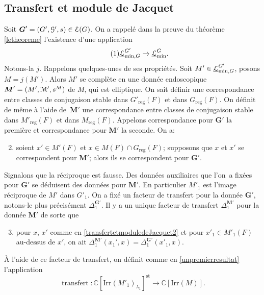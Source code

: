 \documentclass[11pt]{article}
\numberwithin{equation}{section}\providecommand{\og}{«\,}\providecommand{\fg}{\,»}
\let\mathcal \EuScript
\newcommand{\NoChangel}[1]{%
\expandafter\let\csname old\string#1\endcsname=#1
\let#1=\relax
\newcommand{#1}{\mathcode`l="716C\csname old\string#1\endcsname\mathcode`l="7160 }%
}
\newcommand{\Irr}{\mathrm{Irr}}
\newcommand{\trel}{\textup{-rel}} \NoChangel{\trel}
\newcommand{\reg}{\mathrm{reg}}
\newcommand{\st}{\mathrm{st}}
\DeclareMathOperator{\transfert}{transfert}
\newcommand{\bG}{\boldsymbol{G}}
\newcommand{\bM}{\boldsymbol{M}}
\newcommand{\cE}{\mathcal{E}}
\newcommand{\cG}{\mathcal{G}}
\newcommand{\cL}{\mathcal{L}}
\newcommand{\cM}{\mathcal{M}}
\newcommand{\CC}{\mathbb{C}}
\theoremstyle{plain}
\theoremstyle{definition}
\begin{document}
\subsection{Transfert et module de Jacquet}\label{transfertetmoduledeJacquet}
Soit $\bG'=(G',\cG',s)\in \cE(G)$. On a rappelé dans la preuve du théorème \ref{letheoreme} l'existence d'une application
\begin{equation}\tag{1}\label{transfertetmoduledeJacquet1}
\underline{\cL}_{\min,G\trel}^{G'}\to\underline{\cL}_{\min}^G.
\end{equation}
Notons-la $j$. Rappelons quelques-unes de ses propriétés. Soit $M'\in
\underline{\cL}_{\min,G\trel}^{G'}$, posons
$M=j(M')$. Alors $M'$ se complète en une donnée endoscopique $\bM'=(M',\cM',s^M)$ de $M$, qui est elliptique.
On sait définir une correspondance entre classes de conjugaison stable dans $G'_{\reg}(F)$ et dans $G_{\reg}(F)$. On définit de même à l'aide de~$\bM'$ une correspondance entre classes de conjugaison stable dans $M'_{\reg}(F)$ et dans $M_{\reg}(F)$. Appelons correspondance pour $\bG'$ la première et correspondance pour $\bM'$ la seconde. On a:
\begin{enumerate}\setcounter{enumi}{1}
\item\label{transfertetmoduledeJacquet2}
soient $x'\in M'(F)$ et $x\in M(F)\cap G_{\reg}(F)$; supposons que $x$ et $x'$ se correspondent pour $\bM'$; alors ils se correspondent pour $\bG'$.
\end{enumerate}

Signalons que la réciproque est fausse.
Des données auxiliaires que l'on~a fixées pour $\bG'$ se déduisent des données pour $\bM'$. En particulier $M'_{1}$ est l'image réciproque de $M'$ dans $G'_{1}$. On a fixé un facteur de transfert pour la donnée $\bG'$, notons-le plus précisément $\Delta_{1}^{\bG'}$. Il y a un unique facteur de transfert $\Delta_{1}^{\bM'}$ pour la donnée $\bM'$ de sorte que
\begin{enumerate}\setcounter{enumi}{2}
\item\label{transfertetmoduledeJacquet3}
pour $x$, $x'$ comme en \eqref{transfertetmoduledeJacquet2} et pour $x'_{1}\in M'_{1}(F)$ au-dessus de $x'$, on ait
$\Delta_{1}^{\bM'}(x_{1}',x)=\Delta_{1}^{\bG'}(x'_{1},x)$.
\end{enumerate}

À l'aide de ce facteur de transfert, on définit comme en \ref{unpremierresultat} l'application
\[
\transfert:\CC[\Irr(M'_{1})_{\lambda_{1}}]^{\st}\to \CC[\Irr(M)].
\]
\end{document}
